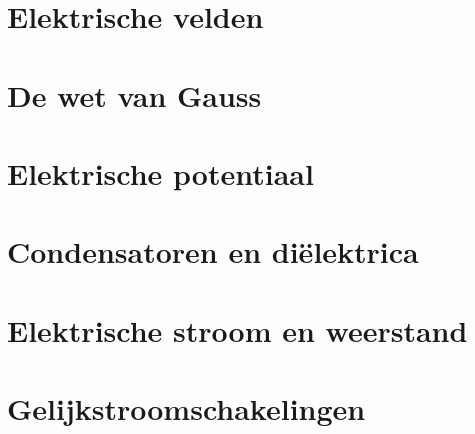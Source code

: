 \documentclass{exam}
\begin{document}
\vspace*{\fill}

\newpage

\section{Elektrische velden}

\vspace{0.5cm}



\newpage

\section{De wet van Gauss}

\vspace{0.5cm}



\newpage

\section{Elektrische potentiaal}

\vspace{0.5cm}



\newpage

\section{Condensatoren en diëlektrica}

\vspace{0.5cm}



\newpage

\newpage

\section{Elektrische stroom en weerstand}

\vspace{0.5cm}



\newpage

\section{Gelijkstroomschakelingen}
\end{document}
